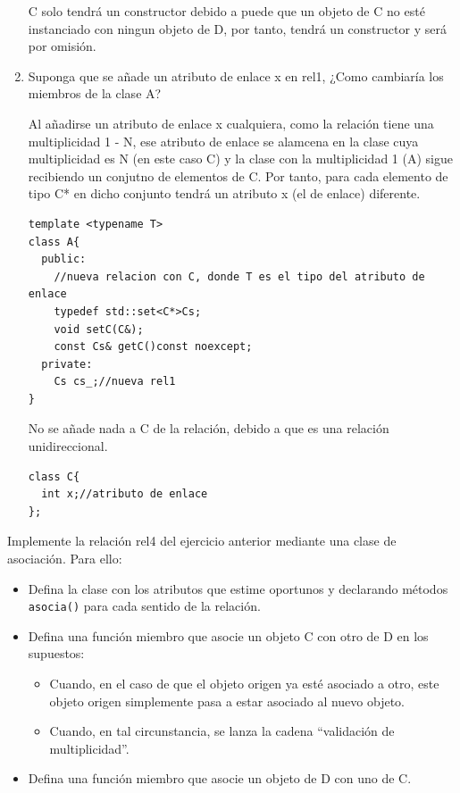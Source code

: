 \begin{enumerate}[label = \alph*)]
    C solo tendrá un constructor debido a puede que un objeto de C no esté instanciado con ningun objeto de D, por tanto, tendrá un constructor y será por omisión.
    \item Suponga que se añade un atributo de enlace x en rel1, ¿Como cambiaría los miembros de la clase A?
   

    Al añadirse un atributo de enlace x cualquiera, como la relación tiene una multiplicidad 1 - N, ese atributo de enlace se alamcena en la clase cuya multiplicidad es N (en este caso C) y la clase con la multiplicidad 1 (A) sigue recibiendo un conjutno de elementos de C.
    Por tanto, para cada elemento de tipo C* en dicho conjunto tendrá un atributo x (el de enlace) diferente.
\begin{verbatim}
template <typename T>
class A{
  public:
    //nueva relacion con C, donde T es el tipo del atributo de enlace
    typedef std::set<C*>Cs;
    void setC(C&);
    const Cs& getC()const noexcept;
  private:
    Cs cs_;//nueva rel1 
}
\end{verbatim}
No se añade nada a C de la relación, debido a que es una relación unidireccional.
\begin{verbatim}
class C{
  int x;//atributo de enlace
};
\end{verbatim}
\end{enumerate}

\newpage
{} Implemente la relación rel4 del ejercicio anterior mediante una clase de asociación. Para ello:
\begin{itemize}
  \item Defina la clase con los atributos que estime oportunos y declarando métodos \texttt{asocia()} para cada sentido de la relación.
  \item Defina una función miembro que asocie un objeto C con otro de D en los supuestos:
  \begin{itemize}
    \item Cuando, en el caso de que el objeto origen ya esté asociado a otro, este objeto origen simplemente pasa a estar asociado al nuevo objeto.
    \item Cuando, en tal circunstancia, se lanza la cadena “validación de multiplicidad”.
  \end{itemize}
  \item Defina una función miembro que asocie un objeto de D con uno de C.
\end{itemize}

